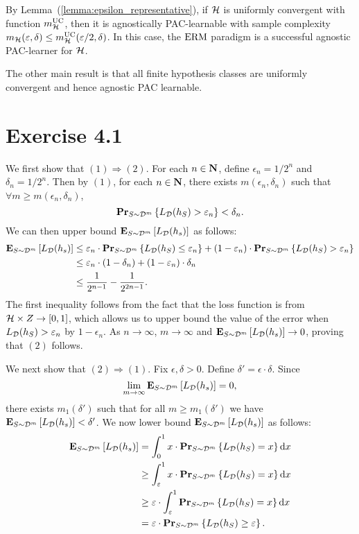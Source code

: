 By Lemma~(\ref{lemma:epsilon_representative}), if $\mathcal{H}$ is uniformly
convergent with function $m_{\mathcal{H}}^{\text{UC}}$, then it is agnostically PAC-learnable
with sample complexity $m_{\mathcal{H}}(\varepsilon, \delta) \leq
m_{\mathcal{H}}^{\text{UC}}(\varepsilon / 2, \delta)$. In this case, the $\operatorname{ERM}$ paradigm is a
successful agnostic PAC-learner for $\mathcal{H}$.

The other main result is that all finite hypothesis classes are uniformly convergent
and hence agnostic PAC learnable.

\section*{Exercise 4.1}

We first show that $(1) \Rightarrow (2)$. For each $n \in \mathbf{N}$, define
$\epsilon_n = 1 / 2^n$ and $\delta_n = 1 / 2^n$. Then by $(1)$, for each
$n \in \mathbf{N}$, there exists $m(\epsilon_n, \delta_n)$ such that
$\forall m \geq m(\epsilon_n, \delta_n)$,
\[
    \mathbf{Pr}_{S \sim \mathcal{D}^{m}} \left \{ L_{\mathcal{D}} (h_S) > \varepsilon_n \right \} < \delta_n.
\]
We can then upper bound $\mathbf{E}_{S \sim \mathcal{D}^m} \left [ L_{\mathcal{D}}(h_s) \right ]$ as follows:
\begin{align*}
\mathbf{E}_{S \sim \mathcal{D}^m} \left [ L_{\mathcal{D}} (h_s) \right ]
& \leq \varepsilon_n \cdot  \mathbf{Pr}_{S \sim \mathcal{D}^{m}} \left \{ L_{\mathcal{D}} (h_S) \leq \varepsilon_n \right \} +
    (1 - \varepsilon_n) \cdot  \mathbf{Pr}_{S \sim \mathcal{D}^{m}} \left \{ L_{\mathcal{D}} (h_S) > \varepsilon_n \right \} \\
& \leq \varepsilon_n \cdot (1 - \delta_n) + (1 - \varepsilon_n) \cdot \delta_n \\
& \leq \frac{1}{2^{n - 1}} - \frac{1}{2^{2n - 1}}.
\end{align*}
The first inequality follows from the fact that the loss function is from
$\mathcal{H} \times Z \rightarrow [0, 1]$, which allows us to upper bound the value of the error
when $L_{\mathcal{D}} (h_S) > \varepsilon_n$ by $1 - \epsilon_n$. As $n \to \infty$, $m \to \infty$
and $\mathbf{E}_{S \sim \mathcal{D}^m} \left [ L_{\mathcal{D}} (h_s) \right ] \to 0$, proving that $(2)$ follows.

We next show that $(2) \Rightarrow (1)$. Fix $\epsilon, \delta > 0$. Define
$\delta' = \epsilon \cdot \delta$. Since
$$\lim_{m \to \infty} \mathbf{E}_{S \sim \mathcal{D}^m} \left [ L_{\mathcal{D}}(h_s) \right ] = 0,$$
there exists $m_1(\delta')$ such that for all $m
\geq m_1(\delta')$ we have $\mathbf{E}_{S \sim \mathcal{D}^m} \left [ L_{\mathcal{D}}(h_s) \right ] < \delta'$.
We now lower bound $\mathbf{E}_{S \sim \mathcal{D}^m} \left [ L_{\mathcal{D}}(h_s) \right ]$ as follows:
\begin{align*}
\mathbf{E}_{S \sim \mathcal{D}^m} \left [ L_{\mathcal{D}}(h_s) \right ]
& = \int_{0}^{1} x \cdot  \mathbf{Pr}_{S \sim \mathcal{D}^{m}} \left \{ L_{\mathcal{D}} (h_S) = x \right \} \text{d} x \\
& \geq \int_{\varepsilon}^1 x \cdot  \mathbf{Pr}_{S \sim \mathcal{D}^{m}} \left \{ L_{\mathcal{D}} (h_S) = x \right \} \text{d} x \\
& \geq \varepsilon \cdot \int_{\varepsilon}^1 \mathbf{Pr}_{S \sim \mathcal{D}^{m}} \left \{ L_{\mathcal{D}} (h_S) = x \right \} \text{d} x \\
& = \varepsilon \cdot  \mathbf{Pr}_{S \sim \mathcal{D}^{m}} \left \{ L_{\mathcal{D}} (h_S) \geq \varepsilon \right \}.
\end{align*}

